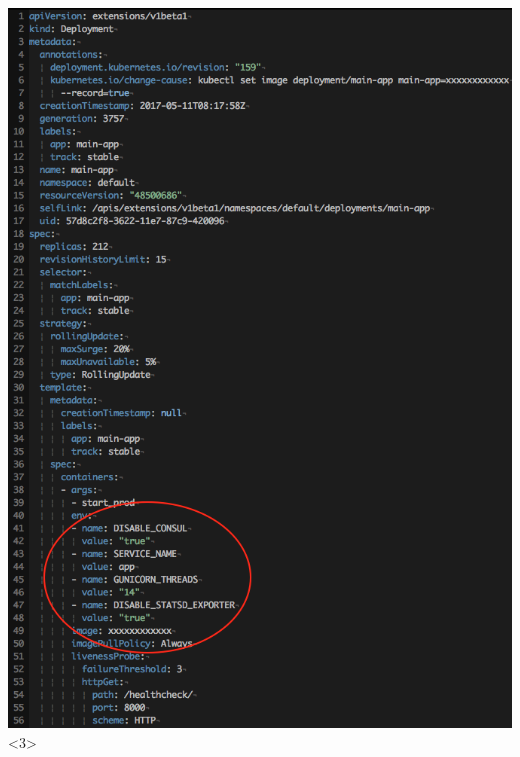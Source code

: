 \documentclass[12pt]{beamer}
\begin{document}
\begin{frame}
\begin{columns}
\begin{center}
                \includegraphics[width=1\textwidth]{images/kubernetes-config-env.png}<3>

\end{center}
\end{columns}
\end{frame}
\end{document}
